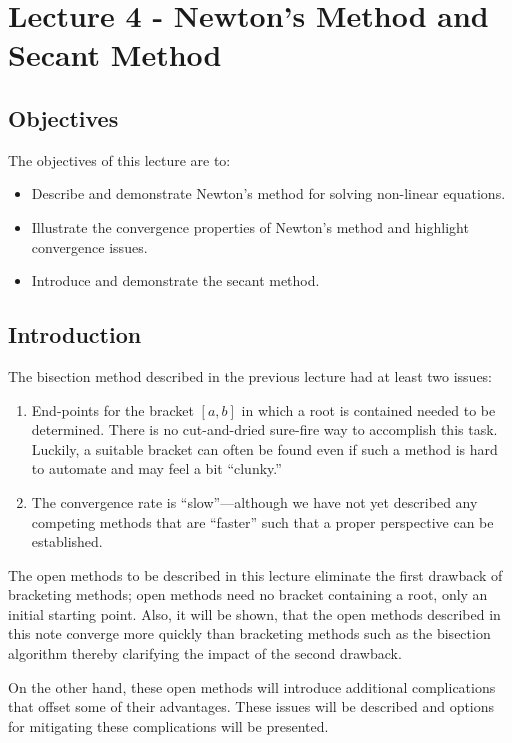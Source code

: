 \chapter{Lecture 4 - Newton's Method and Secant Method}
\label{ch:lec4n}
\section{Objectives}
The objectives of this lecture are to:
\begin{itemize}
\item Describe and demonstrate Newton's method for solving non-linear equations.
\item Illustrate the convergence properties of Newton's method and highlight convergence issues.
\item Introduce and demonstrate the secant method.
\end{itemize}
\setcounter{lstannotation}{0}

\section{Introduction}
The bisection method described in the previous lecture had at least two issues:
\begin{enumerate}
\item End-points for the bracket $\left[a,b\right]$ in which a root is contained needed to be determined.  There is no cut-and-dried sure-fire way to accomplish this task.  Luckily, a suitable bracket can often be found even if such a method is hard to automate and may feel a bit ``clunky.''

\item The convergence rate is ``slow''---although we have not yet described any competing methods that are ``faster'' such that a proper perspective can be established.
\end{enumerate}
The open methods to be described in this lecture eliminate the first drawback of bracketing methods; open methods need no bracket containing a root, only an initial starting point.  Also, it will be shown, that the open methods described in this note converge more quickly than bracketing methods such as the bisection algorithm thereby clarifying the impact of the second drawback. 

On the other hand, these open methods will introduce additional complications that offset some of their advantages.  These issues will be described and options for mitigating these complications will be presented.

